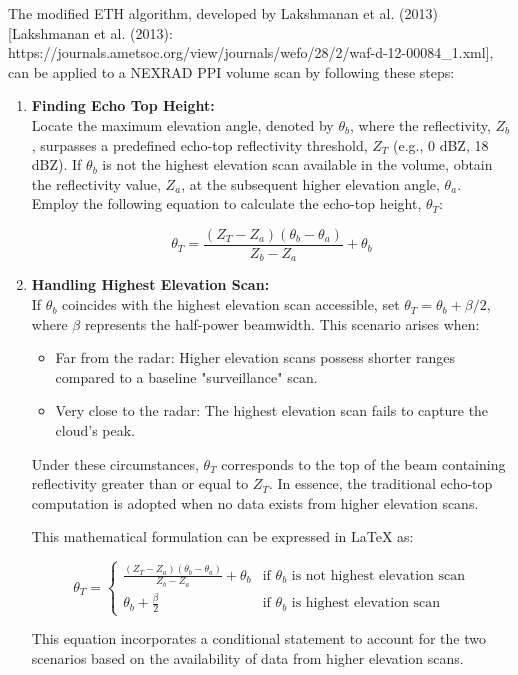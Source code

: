 The modified ETH algorithm, developed by Lakshmanan et al. (2013) [Lakshmanan et
al. (2013):
https://journals.ametsoc.org/view/journals/wefo/28/2/waf-d-12-00084\_1.xml], can
be applied to a NEXRAD PPI volume scan by following these steps:
\begin{enumerate}
    \item \textbf{Finding Echo Top Height:} \\
    Locate the maximum elevation angle, denoted by $\theta_{b}$, where the
reflectivity, $Z_{b}$, surpasses a predefined echo-top reflectivity threshold,
$Z_T$ (e.g., 0 dBZ, 18 dBZ). If $\theta_{b}$ is not the highest elevation scan
available in the volume, obtain the reflectivity value, $Z_{a}$, at the
subsequent higher elevation angle, $\theta_{a}$. Employ the following equation
to calculate the echo-top height, $\theta_T$:

$$\theta_T = \frac{(Z_T - Z_a) (\theta_b - \theta_a)}{Z_b - Z_a} + \theta_b$$

    \item \textbf{Handling Highest Elevation Scan:}\\
    If $\theta_{b}$ coincides with the highest elevation scan accessible, set
    $\theta_{T} = \theta_{b} + \beta/2$, where $\beta$ represents the half-power beamwidth. This scenario arises when:
    \begin{itemize}
        \item Far from the radar: Higher elevation
    scans possess shorter ranges compared to a baseline "surveillance" scan.
        \item Very close to the radar: The highest elevation scan fails to capture the
    cloud's peak.
    \end{itemize}
    
Under these circumstances, $\theta_{T}$ corresponds to the top of the beam
containing reflectivity greater than or equal to $Z_T$. In essence, the
traditional echo-top computation is adopted when no data exists from higher
elevation scans.

This mathematical formulation can be expressed in LaTeX as:

$$\theta_T = \begin{cases} \frac{(Z_T - Z_a) (\theta_b - \theta_a)}{Z_b - Z_a} +
\theta_b & \text{if } \theta_b \text{ is not highest elevation scan} \\
\theta_b + \frac{\beta}{2} & \text{if } \theta_b \text{ is highest elevation
scan} \end{cases}$$

This equation incorporates a conditional statement to account for the two
scenarios based on the availability of data from higher elevation scans.

\end{enumerate}